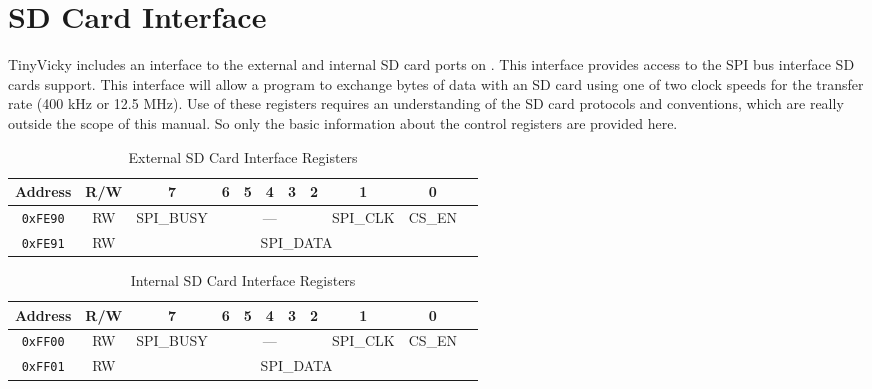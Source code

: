 \chapter{SD Card Interface}

TinyVicky includes an interface to the external and internal SD card ports on \jr. This interface provides access to the SPI bus interface SD cards support. This interface will allow a program to exchange bytes of data with an SD card using one of two clock speeds for the transfer rate (400 kHz or 12.5 MHz).  Use of these registers requires an understanding of the SD card protocols and conventions, which are really outside the scope of this manual. So only the basic information about the control registers are provided here.

\begin{table}[ht]
    \begin{center}
        \begin{tabular}{|c|c|c|c|c|c|c|c|c|c|c|} \hline
            Address & R/W & 7 & 6 & 5 & 4 & 3 & 2 & 1 & 0 \\\hline\hline
            \verb+0xFE90+ & RW & SPI\_BUSY & \multicolumn{5}{|c|}{---} & SPI\_CLK & CS\_EN \\\hline
            \verb+0xFE91+ & RW & \multicolumn{8}{|c|}{SPI\_DATA} \\\hline
        \end{tabular}
    \end{center}
    \caption{External SD Card Interface Registers}
\end{table}

\begin{table}[ht]
    \begin{center}
        \begin{tabular}{|c|c|c|c|c|c|c|c|c|c|c|} \hline
            Address & R/W & 7 & 6 & 5 & 4 & 3 & 2 & 1 & 0 \\\hline\hline
            \verb+0xFF00+ & RW & SPI\_BUSY & \multicolumn{5}{|c|}{---} & SPI\_CLK & CS\_EN \\\hline
            \verb+0xFF01+ & RW & \multicolumn{8}{|c|}{SPI\_DATA} \\\hline
        \end{tabular}
    \end{center}
    \caption{Internal SD Card Interface Registers}
\end{table}

